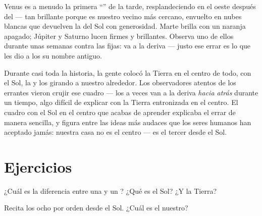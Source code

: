 \begin{example}\label{ex:g4:solar-system:wanderers}
Venus es a menudo la primera ``'' de la tarde, resplandeciendo
en el oeste después del  --- tan brillante porque es nuestro
vecino más cercano, envuelto en nubes blancas que devuelven la  del
Sol con generosidad. Marte brilla con un naranja apagado; Júpiter y
Saturno lucen firmes y brillantes. Observa uno de ellos durante unas
semanas contra las  fijas: va a la deriva --- justo ese
errar es lo que les dio a los  su nombre antiguo.
\end{example}

\begin{remark}\label{rem:g4:solar-system:history}
Durante casi toda la historia, la gente colocó la Tierra en el centro
de todo, con el Sol, la  y los  girando a nuestro
alrededor. Los observadores atentos de los errantes vieron crujir ese
cuadro --- los  a veces van a la deriva \emph{hacia atrás}
durante un tiempo, algo difícil de explicar con la Tierra entronizada
en el centro. El cuadro con el Sol en el centro que acabas de aprender
explicaba el errar de manera sencilla, y figura entre las ideas más
audaces que los seres humanos han aceptado jamás: nuestra casa no es
el centro --- es el tercer  desde el Sol.
\end{remark}

\section{Ejercicios}

\begin{exercise}[$\star$]\label{exo:g4:solar-system:1}
¿Cuál es la diferencia entre una  y un ? ¿Qué es el
Sol? ¿Y la Tierra?
\end{exercise}

\begin{exercise}[$\star$]\label{exo:g4:solar-system:2}
Recita los ocho  por orden desde el Sol. ¿Cuál es el nuestro?
\end{exercise}

